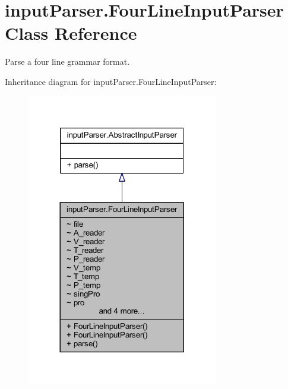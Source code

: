 \hypertarget{classinput_parser_1_1_four_line_input_parser}{\section{input\-Parser.\-Four\-Line\-Input\-Parser Class Reference}
\label{classinput_parser_1_1_four_line_input_parser}
}


Parse a four line grammar format.  




Inheritance diagram for input\-Parser.\-Four\-Line\-Input\-Parser\-:
\nopagebreak
\begin{figure}[H]
\begin{center}
\leavevmode
\includegraphics[width=236pt]{classinput_parser_1_1_four_line_input_parser__inherit__graph}
\end{center}
\end{figure}


